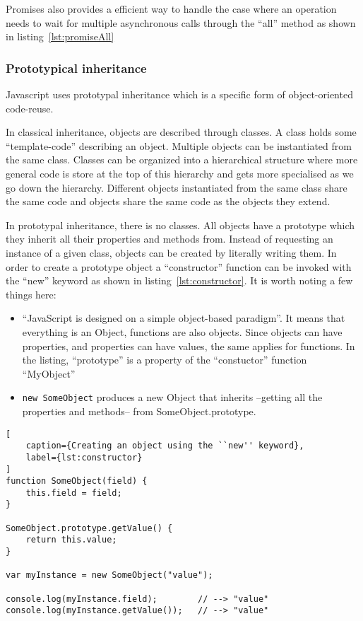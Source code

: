 Promises also provides a efficient way to handle the case where an operation needs to wait for multiple asynchronous calls through the ``all'' method as shown in listing~\ref{lst:promiseAll}



\subsubsection{Prototypical inheritance}

Javascript uses prototypal inheritance which is a specific form of object-oriented code-reuse.

In classical inheritance, objects are described through classes. A class holds some ``template-code'' describing an object. Multiple objects can be instantiated from the same class. Classes can be organized into a hierarchical structure where more general code is store at the top of this hierarchy and gets more specialised as we go down the hierarchy. Different objects instantiated from the same class share the same code and objects share the same code as the objects they extend.

In prototypal inheritance, there is no classes. All objects have a prototype which they inherit all their properties and methods from. Instead of requesting an instance of a given class, objects can be created by literally writing them. In order to create a prototype object a ``constructor'' function can be invoked with the ``new'' keyword as shown in listing~\ref{lst:constructor}. It is worth noting a few things here:
\begin{itemize}
    \item ``JavaScript is designed on a simple object-based paradigm''\cite{mozilla}. It means that everything is an Object, functions are also objects. Since objects can have properties, and properties can have values, the same applies for functions. In the listing, ``prototype'' is a property of the ``constuctor'' function ``MyObject''
    \item \texttt{new SomeObject} produces a new Object that inherits --getting all the properties and methods-- from SomeObject.prototype.
\end{itemize}

\begin{lstlisting}[
    caption={Creating an object using the ``new'' keyword},
    label={lst:constructor}
]
function SomeObject(field) {
    this.field = field;
}

SomeObject.prototype.getValue() {
    return this.value;
}

var myInstance = new SomeObject("value");

console.log(myInstance.field);        // --> "value"
console.log(myInstance.getValue());   // --> "value"
\end{lstlisting}

